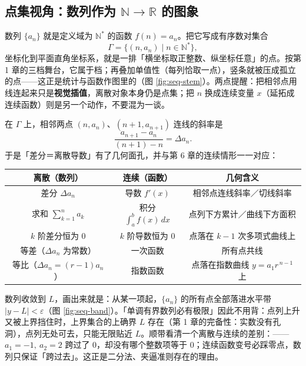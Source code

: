 \begin{explore}

\subsection{点集视角：数列作为 \texorpdfstring{$\mathbb{N}\to\mathbb{R}$}{N 到 R} 的图象}


数列 $\{a_n\}$ 就是定义域为 $\mathbb{N}^*$ 的函数 $f(n)=a_n$。把它写成有序数对集合
\[
  \Gamma=\{(n,a_n)\mid n\in\mathbb{N}^*\},
\]
坐标化到平面直角坐标系，就是一排「横坐标取正整数、纵坐标任意」的点。按第 1 章的三档舞台，它属于档；再叠加单值性（每列恰取一点），竖条就被压成孤立的点——这正是统计与函数作图里的（图 \ref{fig:seq-stem}）。两点提醒：把相邻点用线连起来只是\textbf{视觉插值}，离散对象本身仍是点集；把 $n$ 换成连续变量 $x$（延拓成连续函数）则是另一个动作，不要混为一谈。


在 $\Gamma$ 上，相邻两点 $(n,a_n)$、$(n+1,a_{n+1})$ 连线的斜率是
\[
  \frac{a_{n+1}-a_n}{(n+1)-n}=\Delta a_n .
\]
于是「差分＝离散导数」有了几何面孔，并与第 6 章的连续情形一一对应：

\begin{center}
\begin{tabular}{|c|c|c|}
\hline
\textbf{离散（数列）} & \textbf{连续（函数）} & \textbf{几何含义} \\
\hline
差分 $\Delta a_n$ & 导数 $f'(x)$ & 相邻点连线斜率／切线斜率 \\
\hline
求和 $\sum_{k=1}^na_k$ & 积分 $\int_a^bf(x)\,dx$ & 点列下方累计／曲线下方面积 \\
\hline
$k$ 阶差分恒为 $0$ & $k$ 阶导数恒为 $0$ & 点落在 $k-1$ 次多项式曲线上 \\
\hline
等差（$\Delta a_n$ 为常数） & 一次函数 & 所有点共线 \\
\hline
等比（$\Delta a_n=(r-1)a_n$） & 指数函数 & 点落在指数曲线 $y=a_1r^{\,n-1}$ 上 \\
\hline
\end{tabular}
\end{center}


数列收敛到 $L$，画出来就是：从某一项起，$\{a_n\}$ 的所有点全部落进水平带 $|y-L|<\varepsilon$（图 \ref{fig:seq-band}）。「单调有界数列必有极限」因此不用背：点列上升又被上界挡住时，上界集合的上确界 $L$ 存在（第 1 章的完备性：实数没有孔洞），点列无处可去，只能无限贴近 $L$。顺带看清一个离散与连续的差别：——$a_1=-1,\ a_2=2$ 跨过了 $0$，却没有哪个整数项等于 $0$；连续函数变号必踩零点，数列只保证「跨过去」。这正是二分法、夹逼准则存在的理由。


\end{explore}
